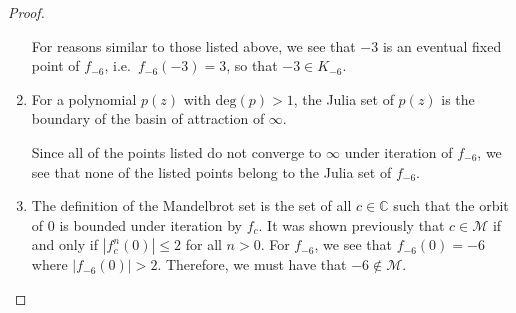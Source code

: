 \begin{proof}
\begin{enumerate}
      For reasons similar to those listed above, we see that $-3$ is an eventual fixed point of
      $f_{-6}$, i.e.\ $f_{-6}(-3) = 3$, so that $-3 \in K_{-6}$.

    \item For a polynomial $p(z)$ with $\text{deg}(p) > 1$, the Julia
      set of $p(z)$ is the boundary of the basin of attraction of $\infty$.

      Since all of the points listed do not converge to $\infty$ under iteration of $f_{-6}$,
      we see that none of the listed points belong to the Julia set of $f_{-6}$.

    \item The definition of the Mandelbrot set
      is the set of all $c \in \mathbb{C}$ such that the orbit of 0 is bounded under iteration by $f_{c}$.
      It was shown previously that $c \in \mathcal{M}$ if and only if $|f_c^n(0)| \leq 2$ for all $n > 0$.
      For $f_{-6}$, we see that $f_{-6}(0) = -6$ where $|f_{-6}(0)| > 2$. Therefore,
      we must have that $-6 \notin \mathcal{M}$.
  \end{enumerate}
\end{proof}
\newpage
